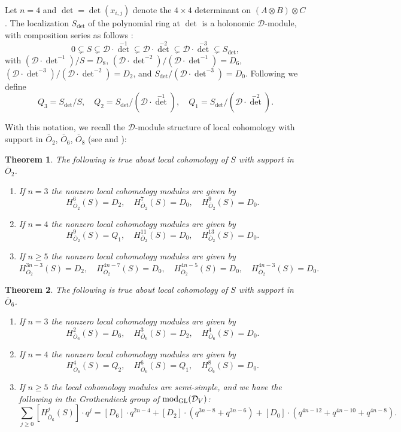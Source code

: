\documentclass[11pt,reqno]{amsart}
\newcommand{\D}{\mathcal{D}}
\newcommand{\oo}{\otimes}
\newcommand{\tn}{\textnormal}
\newcommand{\GL}{\operatorname{GL}}
\renewcommand{\det}{\operatorname{det}}
\newcommand{\ol}[1]{\overline{#1}}
\newtheorem{theorem}{Theorem}[section]
\numberwithin{equation}{section}
\begin{document}
Let $n=4$ and $\det=\det(x_{i,j})$ denote the $4\times 4$ determinant on $(A\oo B)\oo C$. The localization $S_{\det}$ of the polynomial ring at $\det$ is a holonomic $\D$-module, with composition series as follows \cite[Theorem 1.1]{raicu2016characters}:
$$
0\subsetneq S\subsetneq \D\cdot \det^{-1}\subsetneq \D\cdot \det^{-2}\subsetneq \D\cdot \det^{-3}\subsetneq S_{\det},
$$
with $(\D\cdot \det^{-1})/S=D_8$, $(\D\cdot \det^{-2})/(\D\cdot \det^{-1})=D_6$, $(\D\cdot \det^{-3})/(\D\cdot \det^{-2})=D_2$, and $S_{\det}/(\D\cdot \det^{-3})=D_0$. Following \cite{lorcla} we define
\begin{equation}\label{eq:detQ}
Q_3=S_{\det}/S, \quad Q_2=S_{\det}/(\D\cdot \det^{-1}),\quad Q_1=S_{\det}/(\D\cdot \det^{-2}).
\end{equation}

With this notation, we recall the $\D$-module structure of local cohomology with support in $\overline{O}_2$, $\overline{O}_6$, $\overline{O}_8$ (see \cite[Main Theorem]{raicu2016ocal} and \cite[Theorem 1.6]{lorcla}):

\begin{theorem}\label{localSegre}
The following is true about local cohomology of $S$ with support in $\ol{O}_2$.
\begin{enumerate}
\item If $n=3$ the nonzero local cohomology modules	are given by
$$
H^6_{\ol{O}_2}(S)=D_2,\quad H^7_{\ol{O}_2}(S)=D_0,\quad H^9_{\ol{O}_2}(S)=D_0.
$$
\item If $n=4$ the nonzero local cohomology modules are given by 
$$
H^9_{\ol{O}_2}(S)=Q_1,\quad H^{11}_{\ol{O}_2}(S)=D_0,\quad H^{13}_{\ol{O}_2}(S)=D_0.
$$
\item If $n\geq 5$ the nonzero local cohomology modules are given by
$$
H^{3n-3}_{\ol{O}_2}(S)=D_2,\quad H^{4n-7}_{\ol{O}_2}(S)=D_0,\quad H^{4n-5}_{\ol{O}_2}(S)=D_0,\quad H^{4n-3}_{\ol{O}_2}(S)=D_0.
$$
\end{enumerate}
\end{theorem}



\begin{theorem}\label{thm:localcoho6}
The following is true about local cohomology of $S$ with support in $\ol{O}_6$.	
\begin{enumerate}
\item If $n=3$ the nonzero local cohomology modules	are given by
$$
H^2_{\ol{O}_6}(S)=D_6,\quad H^3_{\ol{O}_6}(S)=D_2,\quad H^4_{\ol{O}_6}(S)=D_0.
$$
\item If $n=4$ the nonzero local cohomology modules are given by 
$$
H^4_{\ol{O}_6}(S)=Q_2,\quad H^6_{\ol{O}_6}(S)=Q_1,\quad H^8_{\ol{O}_6}(S)=D_0.
$$
\item If $n\geq 5$ the local cohomology modules are semi-simple, and we have the following in the Grothendieck group of $\tn{mod}_{\GL}(\D_V)$:
$$
\sum_{j\geq 0}[H^j_{\ol{O}_6}(S)]\cdot q^j=[D_6]\cdot q^{2n-4}+[D_2]\cdot (q^{3n-8}+q^{3n-6})+[D_0]\cdot (q^{4n-12}+q^{4n-10}+q^{4n-8}).
$$
\end{enumerate}
\end{theorem}
\end{document}

